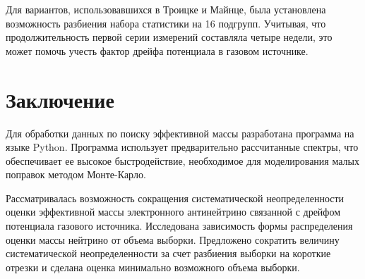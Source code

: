 \documentclass[a4paper,14pt]{extarticle}
\begin{document}
    Для вариантов, использовавшихся в Троицке и Майнце, была установлена возможность разбиения набора
    статистики на 16 подгрупп. Учитывая, что продолжительность первой серии измерений составляла четыре
    недели, это может помочь учесть фактор дрейфа потенциала в газовом источнике.
    
    \newpage
    \section{Заключение}
    Для обработки данных по поиску эффективной массы разработана программа на языке Python. Программа
    использует предварительно рассчитанные спектры, что обеспечивает ее высокое быстродействие,
    необходимое для моделирования малых поправок методом Монте-Карло.
    
    Рассматривалась возможность сокращения систематической неопределенности оценки эффективной массы
    электронного антинейтрино связанной с дрейфом потенциала газового источника. Исследована зависимость
    формы распределения оценки массы нейтрино от объема выборки. Предложено сократить величину
    систематической неопределенности за счет разбиения выборки на короткие отрезки и сделана оценка
    минимально возможного объема выборки.
    
    
    \newpage
    \newrefcontext[sorting=none]
    \printbibliography[heading=bibnumbered]
\end{document}
